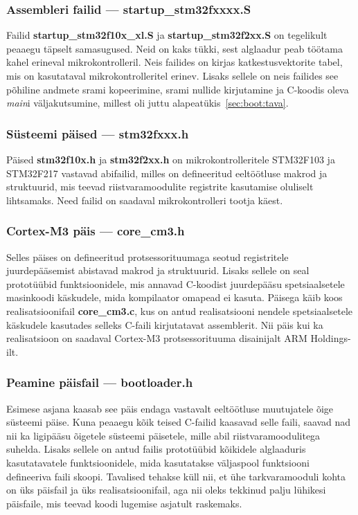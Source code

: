 \documentclass[12pt,a4paper]{article}
\begin{document}
\subsubsection{Assembleri failid --- \textbf{startup\_stm32fxxxx.S}}
Failid \textbf{startup\_stm32f10x\_xl.S} ja \textbf{startup\_stm32f2xx.S} on
tegelikult peaaegu täpselt samasugused. Neid on kaks tükki, sest alglaadur peab
töötama kahel erineval mikrokontrolleril. Neis failides on kirjas
katkestusvektorite tabel, mis on kasutataval mikrokontrolleritel erinev. Lisaks
sellele on neis failides see põhiline andmete \gls{sram}i kopeerimine,
\gls{sram}i nullide kirjutamine ja C-koodis oleva \textit{main}i väljakutsumine,
millest oli juttu alapeatükis~\ref{sec:boot:tava}.

\subsubsection{Süsteemi päised --- \textbf{stm32fxxx.h}}
\label{sec:comp:sysheader}
Päised \textbf{stm32f10x.h} ja \textbf{stm32f2xx.h} on mikrokontrolleritele
STM32F103 ja STM32F217 vastavad abifailid, milles on defineeritud eeltöötluse
makrod ja struktuurid, mis teevad riistvaramoodulite registrite kasutamise
oluliselt lihtsamaks. Need failid on saadaval mikrokontrolleri tootja käest.

\subsubsection{Cortex-M3 päis --- \textbf{core\_cm3.h}}
\label{sec:comp:core}
Selles päises on defineeritud protsessorituumaga seotud registritele
juurdepääsemist abistavad makrod ja struktuurid. Lisaks sellele on seal
prototüübid funktsioonidele, mis annavad C-koodist juurdepääsu spetsiaalsetele
masinkoodi käskudele, mida kompilaator omapead ei kasuta. Päisega käib koos
realisatsioonifail \textbf{core\_cm3.c}, kus on antud realisatsiooni
nendele spetsiaalsetele käskudele kasutades selleks C-faili kirjutatavat
assemblerit. Nii päis kui ka realisatsioon on saadaval Cortex-M3
protsessorituuma disainijalt ARM Holdings-ilt.

\subsubsection{Peamine päisfail --- \textbf{bootloader.h}}
Esimese asjana kaasab see päis endaga vastavalt eeltöötluse muutujatele õige
süsteemi päise. Kuna peaaegu kõik teised C-failid kaasavad selle faili, saavad
nad nii ka ligipääsu õigetele süsteemi päisetele, mille abil
riistvaramoodulitega suhelda. Lisaks sellele on antud failis prototüübid
kõikidele alglaaduris kasutatavatele funktsioonidele, mida kasutatakse
väljaspool funktsiooni defineeriva faili skoopi. Tavalised tehakse küll nii, et
ühe tarkvaramooduli kohta on üks päisfail ja üks realisatsioonifail, aga nii
oleks tekkinud palju lühikesi päisfaile, mis teevad koodi lugemise asjatult
raskemaks.
\end{document}
